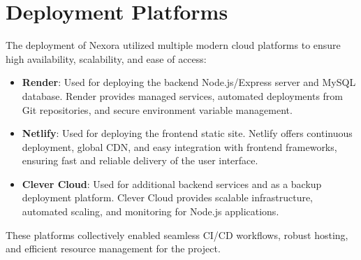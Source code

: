 \section{Deployment Platforms}
The deployment of Nexora utilized multiple modern cloud platforms to ensure high availability, scalability, and ease of access:
\begin{itemize}
    \item \textbf{Render}: Used for deploying the backend Node.js/Express server and MySQL database. Render provides managed services, automated deployments from Git repositories, and secure environment variable management.
    \item \textbf{Netlify}: Used for deploying the frontend static site. Netlify offers continuous deployment, global CDN, and easy integration with frontend frameworks, ensuring fast and reliable delivery of the user interface.
    \item \textbf{Clever Cloud}: Used for additional backend services and as a backup deployment platform. Clever Cloud provides scalable infrastructure, automated scaling, and monitoring for Node.js applications.
\end{itemize}
These platforms collectively enabled seamless CI/CD workflows, robust hosting, and efficient resource management for the project.
